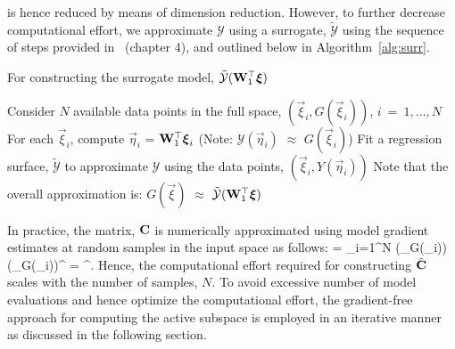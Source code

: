is hence reduced by means of dimension reduction. However, to further decrease computational effort,
we approximate $\mathcal{Y}$ using a surrogate, $\tilde{\mathcal{Y}}$ using the sequence of steps
provided in~\cite{Constantine:2015} (chapter 4), and outlined below in Algorithm~\ref{alg:surr}.
\bigskip
\begin{breakablealgorithm}
\renewcommand{\algorithmicrequire}{\textbf{Input:}}
\renewcommand{\algorithmicensure}{\textbf{Output:}}
  \caption{For constructing the surrogate model, $\tilde{\mathcal{Y}}(\mat{W}_1^\top\vec\xi)$}
  \begin{algorithmic}[1]
	  \State Consider $N$ available data points in the full space, $(\vec\xi_i,G(\vec\xi_i))$, $i~=~1,\ldots,N$
	  \State For each $\vec\xi_i$, compute $\vec\eta_i$ = $\mat{W}_1^\top\vec\xi_i$ 
          (Note: $\mathcal{Y}(\vec{\eta}_i)$ $\approx$ $G(\vec{\xi}_i)$)
	  \State Fit a regression surface, $\tilde{\mathcal{Y}}$ to approximate $\mathcal{Y}$ using the data
                 points, $(\vec\xi_i,Y(\vec\eta_i))$
	  \State Note that the overall approximation is: $G(\vec{\xi})$ $\approx$
                 $\tilde{\mathcal{Y}}(\mat{W}_1^\top\vec{\xi})$ 
	\EndProcedure
  \end{algorithmic}
  \label{alg:surr}
\end{breakablealgorithm}
\bigskip

In practice, the matrix, $\mathbf{{C}}$ is numerically approximated using model gradient estimates at random samples
in the input space as follows:
 \be
 \approx {} = \sum\limits_{i=1}^{N} 
 (\nabla_{\vec{\xi}}G(\vec{\xi}_i))(\nabla_{\vec{\xi}}G(\vec{\xi}_i))^\top
 = \hat{\mat{\Lambda}}^\top.
\label{eq:chat}
 \ee
Hence, the computational effort required for constructing $\hat{\mathbf{{C}}}$ scales with the number of samples, $N$.
To avoid excessive number of model evaluations and hence optimize the computational effort, the gradient-free
approach for computing the active subspace is employed in an iterative manner as discussed in the following section. 
